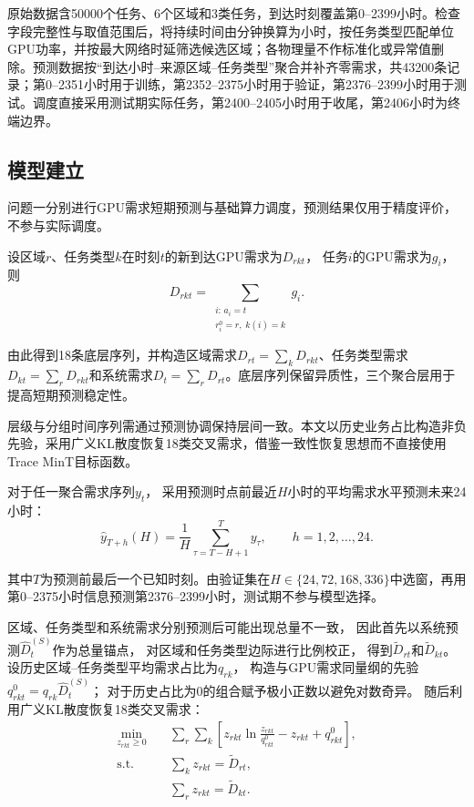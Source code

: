 原始数据含50000个任务、6个区域和3类任务，到达时刻覆盖第0--2399小时。检查字段完整性与取值范围后，将持续时间由分钟换算为小时，按任务类型匹配单位GPU功率，并按最大网络时延筛选候选区域；各物理量不作标准化或异常值删除。预测数据按“到达小时--来源区域--任务类型”聚合并补齐零需求，共43200条记录；第0--2351小时用于训练，第2352--2375小时用于验证，第2376--2399小时用于测试。调度直接采用测试期实际任务，第2400--2405小时用于收尾，第2406小时为终端边界。


\subsection{模型建立}

问题一分别进行GPU需求短期预测与基础算力调度，预测结果仅用于精度评价，不参与实际调度。

设区域$r$、任务类型$k$在时刻$t$的新到达GPU需求为$D_{rkt}$，
任务$i$的GPU需求为$g_i$，则
\begin{equation}
	D_{rkt}
	=
	\sum_{\substack{i:\,a_i=t\\
			r_i^0=r,\;k(i)=k}}
	g_i .
	\label{eq:q1_demand}
\end{equation}

由此得到18条底层序列，并构造区域需求$D_{rt}=\sum_kD_{rkt}$、任务类型需求$D_{kt}=\sum_rD_{rkt}$和系统需求$D_t=\sum_rD_{rt}$。底层序列保留异质性，三个聚合层用于提高短期预测稳定性。

层级与分组时间序列需通过预测协调保持层间一致\cite{ref4}。本文以历史业务占比构造非负先验，采用广义KL散度恢复18类交叉需求，借鉴一致性恢复思想而不直接使用Trace MinT目标函数。

对于任一聚合需求序列$y_t$，
采用预测时点前最近$H$小时的平均需求水平预测未来24小时：
\begin{equation}
	\hat{y}_{T+h}(H)
	=
	\frac{1}{H}
	\sum_{\tau=T-H+1}^{T}y_{\tau},
	\qquad h=1,2,\ldots,24 .
	\label{eq:q1_localmean}
\end{equation}

其中$T$为预测前最后一个已知时刻。由验证集在$H\in\{24,72,168,336\}$中选窗，再用第0--2375小时信息预测第2376--2399小时，测试期不参与模型选择。

区域、任务类型和系统需求分别预测后可能出现总量不一致，
因此首先以系统预测$\hat D_t^{(S)}$作为总量锚点，
对区域和任务类型边际进行比例校正，
得到$\tilde D_{rt}$和$\tilde D_{kt}$。
设历史区域--任务类型平均需求占比为$q_{rk}$，
构造与GPU需求同量纲的先验
$q^0_{rkt}=q_{rk}\hat D_t^{(S)}$；
对于历史占比为0的组合赋予极小正数以避免对数奇异。
随后利用广义KL散度恢复18类交叉需求：
\begin{equation}
	\begin{aligned}
		\min_{z_{rkt}\geq0}\quad
		&\sum_r\sum_k
		\left[
		z_{rkt}\ln\frac{z_{rkt}}{q^0_{rkt}}
		-z_{rkt}+q^0_{rkt}
		\right],\\
		\mathrm{s.t.}\quad
		&\sum_kz_{rkt}=\tilde D_{rt},\\
		&\sum_rz_{rkt}=\tilde D_{kt}.
	\end{aligned}
	\label{eq:q1_kl}
\end{equation}

